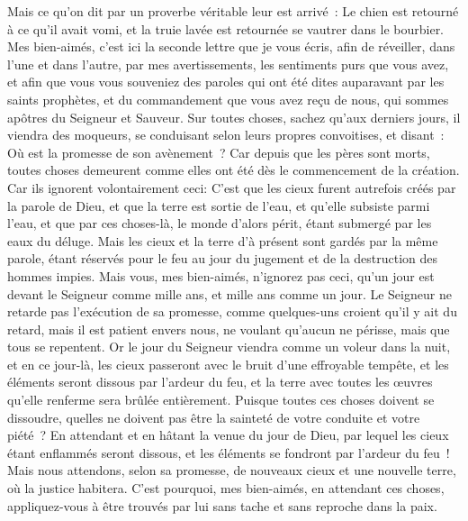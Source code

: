\begin{multicols}{2}
Mais ce qu'on dit par un proverbe véritable leur est arrivé~: Le chien est retourné à ce qu'il avait vomi, et la truie lavée est retournée se vautrer dans le bourbier.
\VerseOne{}Mes bien-aimés, c'est ici la seconde lettre que je vous écris, afin de réveiller, dans l'une et dans l'autre, par mes avertissements, les sentiments purs que vous avez,
et afin que vous vous souveniez des paroles qui ont été dites auparavant par les saints prophètes, et du commandement que vous avez reçu de nous, qui sommes apôtres du Seigneur et Sauveur.
Sur toutes choses, sachez qu'aux derniers jours, il viendra des moqueurs, se conduisant selon leurs propres convoitises,
et disant~: Où est la promesse de son avènement~? Car depuis que les pères sont morts, toutes choses demeurent comme elles ont été dès le commencement de la création.
Car ils ignorent volontairement ceci: C'est que les cieux furent autrefois créés par la parole de Dieu, et que la terre est sortie de l'eau, et qu'elle subsiste parmi l'eau,
et que par ces choses-là, le monde d'alors périt, étant submergé par les eaux du déluge.
Mais les cieux et la terre d'à présent sont gardés par la même parole, étant réservés pour le feu au jour du jugement et de la destruction des hommes impies.
Mais vous, mes bien-aimés, n'ignorez pas ceci, qu'un jour est devant le Seigneur comme mille ans, et mille ans comme un jour.
Le Seigneur ne retarde pas l'exécution de sa promesse, comme quelques-uns croient qu'il y ait du retard, mais il est patient envers nous, ne voulant qu'aucun ne périsse, mais que tous se repentent.
Or le jour du Seigneur viendra comme un voleur dans la nuit, et en ce jour-là, les cieux passeront avec le bruit d'une effroyable tempête, et les éléments seront dissous par l'ardeur du feu, et la terre avec toutes les œuvres qu'elle renferme sera brûlée entièrement.
Puisque toutes ces choses doivent se dissoudre, quelles ne doivent pas être la sainteté de votre conduite et votre piété~?
En attendant et en hâtant la venue du jour de Dieu, par lequel les cieux étant enflammés seront dissous, et les éléments se fondront par l'ardeur du feu~!
Mais nous attendons, selon sa promesse, de nouveaux cieux et une nouvelle terre, où la justice habitera.
C'est pourquoi, mes bien-aimés, en attendant ces choses, appliquez-vous à être trouvés par lui sans tache et sans reproche dans la paix.

\end{multicols}
